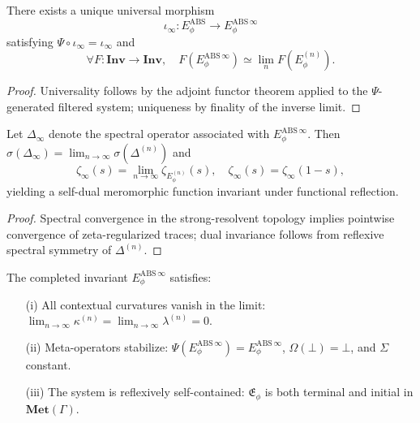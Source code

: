 \begin{theorem}\label{thm:absolute-universality}
There exists a unique universal morphism
\[
\iota_\infty:
E_\phi^{\mathrm{ABS}}
\longrightarrow
E_\phi^{\mathrm{ABS}\,\infty}
\]
satisfying 
$\Psi\circ\iota_\infty=\iota_\infty$ and 
\[
\forall F:\mathbf{Inv}\to\mathbf{Inv},\quad
F(E_\phi^{\mathrm{ABS}\,\infty})
\simeq
\lim_{n}F(E_\phi^{(n)}).
\]
\end{theorem}

\begin{proof}
Universality follows by the adjoint functor theorem applied to the $\Psi$-generated filtered system; uniqueness by finality of the inverse limit. \relax
\end{proof}


\begin{theorem}\label{thm:absolute-spectral}
Let $\Delta_\infty$ denote the spectral operator associated with $E_\phi^{\mathrm{ABS}\,\infty}$.
Then $\sigma(\Delta_\infty)=\lim_{n\to\infty}\sigma(\Delta^{(n)})$
and
\[
\zeta_{\infty}(s)
=\lim_{n\to\infty}\zeta_{E_\phi^{(n)}}(s),
\quad
\zeta_\infty(s)=\zeta_\infty(1-s),
\]
yielding a self-dual meromorphic function invariant under functional reflection.
\end{theorem}

\begin{proof}
Spectral convergence in the strong-resolvent topology implies pointwise convergence of zeta-regularized traces; dual invariance follows from reflexive spectral symmetry of $\Delta^{(n)}$. \relax
\end{proof}


\begin{theorem}\label{thm:absolute-coherence}
The completed invariant $E_\phi^{\mathrm{ABS}\,\infty}$ satisfies:
\begin{enumerate}
  \item[(i)] All contextual curvatures vanish in the limit:
  $\displaystyle\lim_{n\to\infty}\kappa^{(n)}=\lim_{n\to\infty}\lambda^{(n)}=0.$
  \item[(ii)] Meta-operators stabilize:
  $\Psi(E_\phi^{\mathrm{ABS}\,\infty})=E_\phi^{\mathrm{ABS}\,\infty}$,
  $\Omega(\bot)=\bot$, and $\Sigma$ constant.
  \item[(iii)] The system is reflexively self-contained:
  $\mathfrak E_\phi$ is both terminal and initial in $\mathbf{Met}(\Gamma)$.
\end{enumerate}
\end{theorem}

